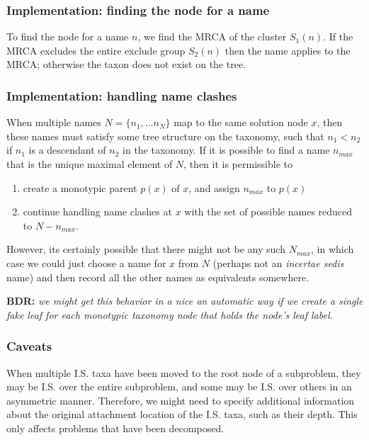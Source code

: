 \documentclass[english]{article}
\begin{document}
\subsubsection{Implementation: finding the node for a name}

To find the node for a name $n$, we find the MRCA of the cluster
$S_{1}(n)$.
If the MRCA excludes the entire exclude group $S_{2}(n)$
then the name applies to the MRCA; otherwise the taxon does not exist
on the tree.

\subsubsection{Implementation: handling name clashes}

When multiple names $N=\{n_{1},\ldots n_{N}\}$ map to the same
solution node $x$, then these names must satisfy some tree structure
on the taxonomy, such that $n_{1}<n_{2}$ if $n_{1}$ is a descendant of
$n_{2}$ in the taxonomy.
If it is possible to find a name $n_{max}$
that is the unique maximal element of $N$, then it is permissible to
\begin{enumerate}
    \item create a monotypic parent $p(x)$ of $x$, and
assign $n_{max}$ to $p(x)$ 
    \item continue handling name clashes at $x$
with the set of possible names reduced to $N-n_{max}$.

\end{enumerate}
However, its certainly possible that there might not be any such
$N_{max}$, in which case we could just choose a name for $x$ from $N$
(perhaps not an \emph{incertae sedis} name) and then record all the
other names as equivalents somewhere.

\textbf{BDR:}\textbf{\emph{ }}\emph{we might get this behavior in a
nice an automatic way if we create a single fake leaf for each
monotypic taxonomy node that holds the node's leaf label.}

\subsubsection{Caveats}

When multiple I.S.
taxa have been moved to the root node of a
subproblem, they may be I.S.
over the entire subproblem, and some may
be I.S.
over others in an asymmetric manner.
Therefore, we might need
to specify additional information about the original attachment
location of the I.S.
taxa, such as their depth.
This only affects
problems that have been decomposed.
\end{document}
